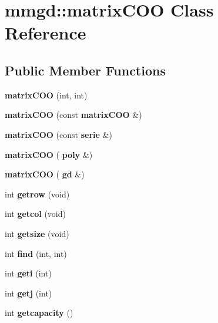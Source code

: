 \section{mmgd\+:\+:matrix\+C\+OO Class Reference}
\label{classmmgd_1_1matrix_c_o_o}
\subsection*{Public Member Functions}
\begin{DoxyCompactItemize}
\item 
\mbox{\label{classmmgd_1_1matrix_c_o_o_a7e2028badd60bdd472de256b409324b5}} 
{\bfseries matrix\+C\+OO} (int, int)
\item 
\mbox{\label{classmmgd_1_1matrix_c_o_o_a49d3c9a057331c4c3bcf30f73fe99dfb}} 
{\bfseries matrix\+C\+OO} (const \textbf{ matrix\+C\+OO} \&)
\item 
\mbox{\label{classmmgd_1_1matrix_c_o_o_a4dd62951f8212c7e4ed7b2d14f2e3574}} 
{\bfseries matrix\+C\+OO} (const \textbf{ serie} \&)
\item 
\mbox{\label{classmmgd_1_1matrix_c_o_o_a2dbf90c5826e4b77ab5baa716e06dd1b}} 
{\bfseries matrix\+C\+OO} (\textbf{ poly} \&)
\item 
\mbox{\label{classmmgd_1_1matrix_c_o_o_aa7f5318fd8a5e7179b38a0fb383908cd}} 
{\bfseries matrix\+C\+OO} (\textbf{ gd} \&)
\item 
\mbox{\label{classmmgd_1_1matrix_c_o_o_ab65b805101a4549e3843d53824cf635d}} 
int {\bfseries getrow} (void)
\item 
\mbox{\label{classmmgd_1_1matrix_c_o_o_a94735fbc3c3bbaa5686470cab8874473}} 
int {\bfseries getcol} (void)
\item 
\mbox{\label{classmmgd_1_1matrix_c_o_o_abb0d3e9afe296c913220a4f7141a672c}} 
int {\bfseries getsize} (void)
\item 
\mbox{\label{classmmgd_1_1matrix_c_o_o_a05d81d10c5b8e9369c7fb40fe3e829dc}} 
int {\bfseries find} (int, int)
\item 
\mbox{\label{classmmgd_1_1matrix_c_o_o_a35924b5302e93610a9be7e69bf5d2aa2}} 
int {\bfseries geti} (int)
\item 
\mbox{\label{classmmgd_1_1matrix_c_o_o_a74b6d046e3df7cfeeefa17c2eface9be}} 
int {\bfseries getj} (int)
\item 
\mbox{\label{classmmgd_1_1matrix_c_o_o_ac140516f7da9ee00e85d7197bc80691e}} 
int {\bfseries getcapacity} ()
\item 
\mbox{\label{classmmgd_1_1matrix_c_o_o_a1a6c6002e893f0e49a9b9285a95fa3b0}} 

\end{DoxyCompactItemize}
